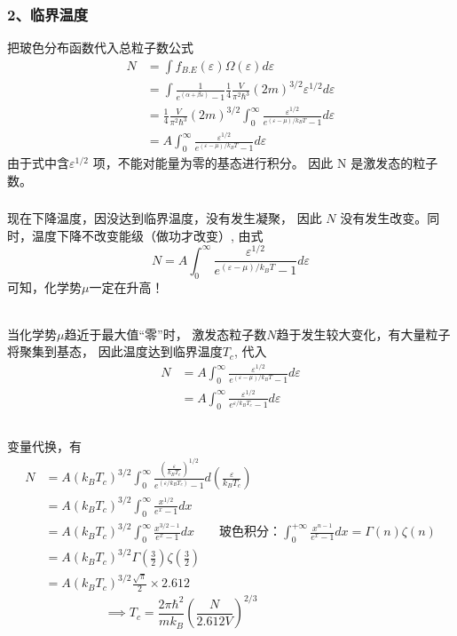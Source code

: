 \begin{frame}
  \frametitle{ 2、临界温度}
  把玻色分布函数代入总粒子数公式
  \[ 
    \begin{aligned}
      N &=\int f_{B.E}(\varepsilon) \Omega (\varepsilon) d \varepsilon \\ 
      &= \int  \frac{1}{e^{(\alpha +\beta \varepsilon)}-1} \frac{1}{4} \frac{V}{\pi ^2 \hbar^3} (2m)^{3/2} \varepsilon^{1/2} d \varepsilon   \\
      &= \frac{1}{4} \frac{V}{\pi ^2 \hbar^3} (2m)^{3/2} \int_0^\infty \frac{\varepsilon^{1/2}}{e^{(\varepsilon - \mu) /k_B T }-1} d \varepsilon \\
      &= A \int_0^\infty \frac{\varepsilon^{1/2}}{e^{(\varepsilon - \mu) /k_B T }-1} d \varepsilon 
    \end{aligned}
     \]
     由于式中含$ \varepsilon^{1/2} $ 项，不能对能量为零的基态进行积分。 因此 N 是激发态的粒子数。
\end{frame} 

\begin{frame}
  \frametitle{}
  现在下降温度，因没达到临界温度，没有发生凝聚， 因此 $N$ 没有发生改变。同时，温度下降不改变能级（做功才改变）, 由式
  \[N = A \int_0^\infty \frac{\varepsilon^{1/2}}{e^{(\varepsilon - \mu) /k_B T }-1} d \varepsilon \]
  可知，化学势$\mu$一定在升高！

  ~~\\ 
  当化学势$\mu$趋近于最大值“零”时， 激发态粒子数$N$趋于发生较大变化，有大量粒子将聚集到基态， 因此温度达到临界温度$T_c$, 代入  
  \[\begin{aligned}
    N &= A \int_0^\infty \frac{\varepsilon^{1/2}}{e^{(\varepsilon - \mu) /k_B T }-1} d \varepsilon  \\
    &=  A \int_0^\infty \frac{\varepsilon^{1/2}}{e^{\varepsilon /k_B T_c }-1} d \varepsilon \\
  \end{aligned}\]
\end{frame} 


\begin{frame}
  \frametitle{}
变量代换，有
\[\begin{aligned}
  N &=  A (k_B T_c)^{3/2} \int_0^\infty \frac{(\frac{\varepsilon}{k_B T_c}) ^{1/2}}{e^{(\varepsilon /k_B T_c )}-1} d (\frac{\varepsilon}{k_B T_c}) \\
  &=  A (k_B T_c)^{3/2} \int_0^\infty \frac{x ^{1/2}}{e^x-1} d x \\
  &= A (k_B T_c)^{3/2} \int_0^\infty \frac{x ^{3/2 -1}}{e^x-1} d x \qquad \text{玻色积分：}\int_{0}^{+\infty} \frac{x ^{n -1}}{e^x-1} d x  = \Gamma(n)\zeta(n) \\
  &= A(k_B T_c)^{3/2} \Gamma(\frac{3}{2})\zeta(\frac{3}{2})  \\
  &= A(k_B T_c)^{3/2}\frac{\sqrt{\pi} }{2} \times 2.612 
\end{aligned}\]
\[ \implies T_c = \frac{2\pi \hbar^2}{m k_B} \left( \frac{N}{2.612 V} \right)^{2/3} \qquad \qquad \qquad \qquad\]
\end{frame} 

